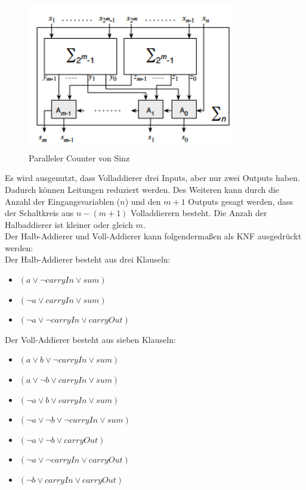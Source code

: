 \documentclass[a4,abstract=on]{scrartcl}
\begin{document}
\begin{figure}[H]
\centering
\includegraphics[width=9cm]{Sinz_para.png}
\caption{Paralleler Counter von Sinz \cite[siehe][Seite 9] {sinz}}
\label{fig:sinz_counter_para}
\end{figure}

Es wird ausgenutzt, dass Volladdierer drei Inputs, aber nur zwei Outputs haben. Dadurch können Leitungen reduziert werden. Des Weiteren kann durch die Anzahl der Eingangsvariablen ($n$) und den $m+1$ Outputs gesagt werden, dass der Schaltkreis aus $n-(m+1)$ Volladdierern besteht. Die Anzah der Halbaddierer ist kleiner oder gleich $m$.\\

Der Halb-Addierer und Voll-Addierer kann folgendermaßen als KNF ausgedrückt werden:\\
Der Halb-Addierer besteht aus drei Klauseln:
\begin{itemize}
\item $(a \vee \neg carryIn \vee sum)$
\item $(\neg a \vee carryIn \vee sum)$
\item $(\neg a \vee \neg carryIn \vee carryOut )$
\end{itemize}

Der Voll-Addierer besteht aus sieben Klauseln:
\begin{itemize}
\item $(a \vee b \vee \neg carryIn \vee sum)$
\item $( a \vee \neg b \vee carryIn \vee sum)$
\item $(\neg a \vee b \vee carryIn \vee sum )$
\item $(\neg a \vee \neg b \vee \neg carryIn \vee sum)$
\item$(\neg a \vee \neg b \vee carryOut)$
\item$(\neg a \vee \neg carryIn \vee carryOut)$
\item$(\neg b \vee carryIn \vee carryOut)$
\end{itemize}
\end{document}
